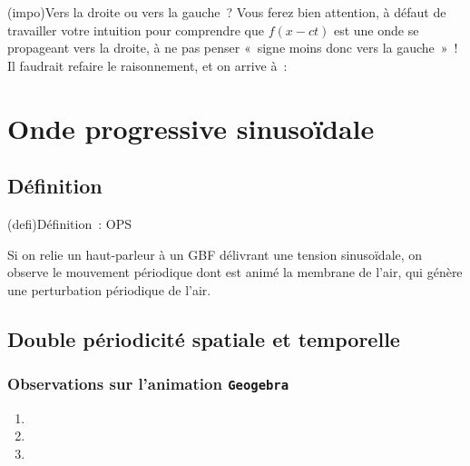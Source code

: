 \documentclass[../../main/main.tex]{subfiles}
\begin{document}
\begin{tcb}(impo){Vers la droite ou vers la gauche~?}
	Vous ferez bien attention, à défaut de travailler votre intuition pour
	comprendre que $f (x-ct)$ est une onde se propageant vers la droite, à ne pas
	penser «~signe moins donc vers la gauche~»~! Il faudrait refaire le
	raisonnement, et on arrive à~:
	\smallbreak
	\begin{isd}
		\psw{
			\[
				f (x+ct) = g \left( t + \frac{x}{c} \right)
			\]
		}
		\tcblower
		\psw{
			\[
				f (x-ct) = g \left( t - \frac{x}{c} \right)
			\]
		}
	\end{isd}
\end{tcb}

\section{Onde progressive sinuso\"idale}
\subsection{Définition}

\begin{tcb}(defi){Définition~: OPS}
\end{tcb}

Si on relie un haut-parleur à un GBF délivrant une tension sinusoïdale, on
observe le mouvement périodique dont est animé la membrane de l'air, qui génère
une perturbation périodique de l'air.


\subsection{Double périodicité spatiale et temporelle}
\subsubsection{Observations sur l'animation \texttt{Geogebra}}
\begin{enumerate}
	\item
	\item
	\item
\end{enumerate}
\end{document}
